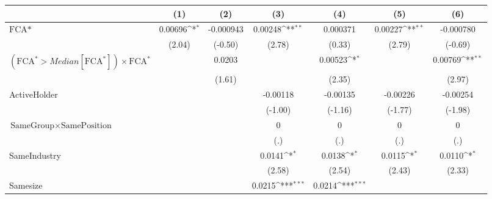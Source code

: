 {
\def\sym#1{\ifmmode^{#1}\else\(^{#1}\)\fi}
\begin{tabular}{l*{6}{c}}
\hline\hline
                    &\multicolumn{1}{c}{(1)}         &\multicolumn{1}{c}{(2)}         &\multicolumn{1}{c}{(3)}         &\multicolumn{1}{c}{(4)}         &\multicolumn{1}{c}{(5)}         &\multicolumn{1}{c}{(6)}         \\
\hline
$ \text{FCA*} $     &     0.00696\sym{*}  &   -0.000943         &     0.00248\sym{**} &    0.000371         &     0.00227\sym{**} &   -0.000780         \\
                    &      (2.04)         &     (-0.50)         &      (2.78)         &      (0.33)         &      (2.79)         &     (-0.69)         \\
[1em]
 $ (\text{FCA}^* > Median[\text{FCA}^*]) \times {\text{FCA} ^*}  $ &                     &      0.0203         &                     &     0.00523\sym{*}  &                     &     0.00769\sym{**} \\
                    &                     &      (1.61)         &                     &      (2.35)         &                     &      (2.97)         \\
[1em]
ActiveHolder        &                     &                     &    -0.00118         &    -0.00135         &    -0.00226         &    -0.00254         \\
                    &                     &                     &     (-1.00)         &     (-1.16)         &     (-1.77)         &     (-1.98)         \\
[1em]
 $ \text{SameGroup} \times \text{SamePosition} $&                     &                     &           0         &           0         &           0         &           0         \\
                    &                     &                     &         (.)         &         (.)         &         (.)         &         (.)         \\
[1em]
SameIndustry        &                     &                     &      0.0141\sym{*}  &      0.0138\sym{*}  &      0.0115\sym{*}  &      0.0110\sym{*}  \\
                    &                     &                     &      (2.58)         &      (2.54)         &      (2.43)         &      (2.33)         \\
[1em]
Samesize            &                     &                     &      0.0215\sym{***}&      0.0214\sym{***}&                     &                     \\

\end{tabular}}
